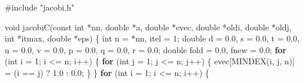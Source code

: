 \documentclass[
  12pt,
  letterpaper,
  DIV=11,
  numbers=noendperiod]{scrreprt}
\newenvironment{Shaded}{\begin{snugshade}}{\end{snugshade}}
\newcommand{\ControlFlowTok}[1]{\textcolor[rgb]{0.00,0.23,0.31}{\textbf{#1}}}
\newcommand{\DataTypeTok}[1]{\textcolor[rgb]{0.68,0.00,0.00}{#1}}
\newcommand{\DecValTok}[1]{\textcolor[rgb]{0.68,0.00,0.00}{#1}}
\newcommand{\FloatTok}[1]{\textcolor[rgb]{0.68,0.00,0.00}{#1}}
\newcommand{\ImportTok}[1]{\textcolor[rgb]{0.00,0.46,0.62}{#1}}
\newcommand{\NormalTok}[1]{\textcolor[rgb]{0.00,0.23,0.31}{#1}}
\newcommand{\OperatorTok}[1]{\textcolor[rgb]{0.37,0.37,0.37}{#1}}
\newcommand{\PreprocessorTok}[1]{\textcolor[rgb]{0.68,0.00,0.00}{#1}}
\theoremstyle{remark}
\begin{document}
\begin{Shaded}
\begin{Highlighting}[]
\PreprocessorTok{\#include }\ImportTok{"jacobi.h"}

\DataTypeTok{void}\NormalTok{ jacobiC}\OperatorTok{(}\DataTypeTok{const} \DataTypeTok{int} \OperatorTok{*}\NormalTok{nn}\OperatorTok{,} \DataTypeTok{double} \OperatorTok{*}\NormalTok{a}\OperatorTok{,} \DataTypeTok{double} \OperatorTok{*}\NormalTok{evec}\OperatorTok{,} \DataTypeTok{double} \OperatorTok{*}\NormalTok{oldi}\OperatorTok{,} \DataTypeTok{double} \OperatorTok{*}\NormalTok{oldj}\OperatorTok{,}
             \DataTypeTok{int} \OperatorTok{*}\NormalTok{itmax}\OperatorTok{,} \DataTypeTok{double} \OperatorTok{*}\NormalTok{eps}\OperatorTok{)} \OperatorTok{\{}
    \DataTypeTok{int}\NormalTok{ n }\OperatorTok{=} \OperatorTok{*}\NormalTok{nn}\OperatorTok{,}\NormalTok{ itel }\OperatorTok{=} \DecValTok{1}\OperatorTok{;}
    \DataTypeTok{double}\NormalTok{ d }\OperatorTok{=} \FloatTok{0.0}\OperatorTok{,}\NormalTok{ s }\OperatorTok{=} \FloatTok{0.0}\OperatorTok{,}\NormalTok{ t }\OperatorTok{=} \FloatTok{0.0}\OperatorTok{,}\NormalTok{ u }\OperatorTok{=} \FloatTok{0.0}\OperatorTok{,}\NormalTok{ v }\OperatorTok{=} \FloatTok{0.0}\OperatorTok{,}\NormalTok{ p }\OperatorTok{=} \FloatTok{0.0}\OperatorTok{,}\NormalTok{ q }\OperatorTok{=} \FloatTok{0.0}\OperatorTok{,}
\NormalTok{           r }\OperatorTok{=} \FloatTok{0.0}\OperatorTok{;}
    \DataTypeTok{double}\NormalTok{ fold }\OperatorTok{=} \FloatTok{0.0}\OperatorTok{,}\NormalTok{ fnew }\OperatorTok{=} \FloatTok{0.0}\OperatorTok{;}
    \ControlFlowTok{for} \OperatorTok{(}\DataTypeTok{int}\NormalTok{ i }\OperatorTok{=} \DecValTok{1}\OperatorTok{;}\NormalTok{ i }\OperatorTok{\textless{}=}\NormalTok{ n}\OperatorTok{;}\NormalTok{ i}\OperatorTok{++)} \OperatorTok{\{}
        \ControlFlowTok{for} \OperatorTok{(}\DataTypeTok{int}\NormalTok{ j }\OperatorTok{=} \DecValTok{1}\OperatorTok{;}\NormalTok{ j }\OperatorTok{\textless{}=}\NormalTok{ n}\OperatorTok{;}\NormalTok{ j}\OperatorTok{++)} \OperatorTok{\{}
\NormalTok{            evec}\OperatorTok{[}\NormalTok{MINDEX}\OperatorTok{(}\NormalTok{i}\OperatorTok{,}\NormalTok{ j}\OperatorTok{,}\NormalTok{ n}\OperatorTok{)]} \OperatorTok{=} \OperatorTok{(}\NormalTok{i }\OperatorTok{==}\NormalTok{ j}\OperatorTok{)} \OperatorTok{?} \FloatTok{1.0} \OperatorTok{:} \FloatTok{0.0}\OperatorTok{;}
        \OperatorTok{\}}
    \OperatorTok{\}}
    \ControlFlowTok{for} \OperatorTok{(}\DataTypeTok{int}\NormalTok{ i }\OperatorTok{=} \DecValTok{1}\OperatorTok{;}\NormalTok{ i }\OperatorTok{\textless{}=}\NormalTok{ n}\OperatorTok{;}\NormalTok{ i}\OperatorTok{++)} \OperatorTok{\{}

\end{Highlighting}
\end{Shaded}
\end{document}
